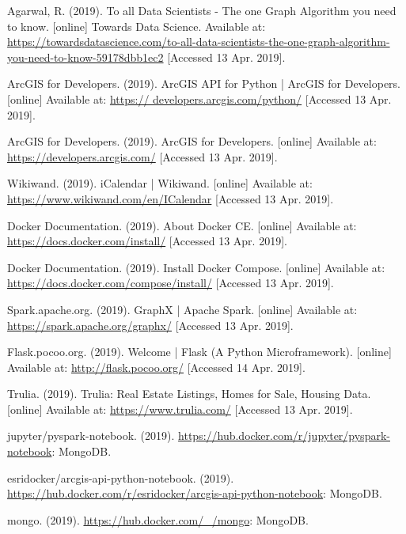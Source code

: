 \documentclass[11 pt]{IEEEtran}
\theoremstyle{definition}
\theoremstyle{definition}
\begin{document}

\begin{thebibliography}{99}
  
Agarwal, R. (2019). To all Data Scientists - The one Graph Algorithm you need to know. [online] Towards Data Science. Available at: \url{https://towardsdatascience.com/to-all-data-scientists-the-one-graph-algorithm-you-need-to-know-59178dbb1ec2} [Accessed 13 Apr. 2019].

ArcGIS for Developers. (2019). ArcGIS API for Python | ArcGIS for Developers. [online] Available at: \url{https://
developers.arcgis.com/python/} [Accessed 13 Apr. 2019].

ArcGIS for Developers. (2019). ArcGIS for Developers. [online] Available at: \url{https://developers.arcgis.com/} [Accessed 13 Apr. 2019].

Wikiwand. (2019). iCalendar | Wikiwand. [online] Available at: \url{https://www.wikiwand.com/en/ICalendar} [Accessed 13 Apr. 2019].
  
Docker Documentation. (2019). About Docker CE. [online] Available at: \url{https://docs.docker.com/install/} [Accessed 13 Apr. 2019].

Docker Documentation. (2019). Install Docker Compose. [online] Available at: \url{https://docs.docker.com/compose/install/} [Accessed 13 Apr. 2019].
  
Spark.apache.org. (2019). GraphX | Apache Spark. [online] Available at: \url{https://spark.apache.org/graphx/} [Accessed 13 Apr. 2019].

Flask.pocoo.org. (2019). Welcome | Flask (A Python Microframework). [online] Available at: \url{http://flask.pocoo.org/} [Accessed 14 Apr. 2019].

Trulia. (2019). Trulia: Real Estate Listings, Homes for Sale, Housing Data. [online] Available at: \url{https://www.trulia.com/} [Accessed 13 Apr. 2019].


jupyter/pyspark-notebook. (2019). \url{https://hub.docker.com/r/jupyter/pyspark-notebook}: MongoDB.

esridocker/arcgis-api-python-notebook. (2019). \url{https://hub.docker.com/r/esridocker/arcgis-api-python-notebook}: MongoDB.

mongo. (2019). \url{https://hub.docker.com/_/mongo}: MongoDB.

\end{thebibliography}
\end{document}
